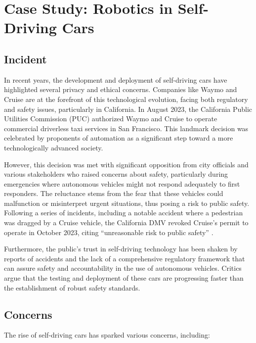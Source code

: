 \section{Case Study: Robotics in Self-Driving Cars}

\subsection{Incident}
In recent years, the development and deployment of self-driving cars have highlighted several privacy and ethical concerns. Companies like Waymo and Cruise are at the forefront of this technological evolution, facing both regulatory and safety issues, particularly in California. In August 2023, the California Public Utilities Commission (PUC) authorized Waymo and Cruise to operate commercial driverless taxi services in San Francisco. This landmark decision was celebrated by proponents of automation as a significant step toward a more technologically advanced society.

However, this decision was met with significant opposition from city officials and various stakeholders who raised concerns about safety, particularly during emergencies where autonomous vehicles might not respond adequately to first responders. The reluctance stems from the fear that these vehicles could malfunction or misinterpret urgent situations, thus posing a risk to public safety. Following a series of incidents, including a notable accident where a pedestrian was dragged by a Cruise vehicle, the California DMV revoked Cruise’s permit to operate in October 2023, citing “unreasonable risk to public safety” \cite{usc_viterbi} \cite{brookings}.

Furthermore, the public's trust in self-driving technology has been shaken by reports of accidents and the lack of a comprehensive regulatory framework that can assure safety and accountability in the use of autonomous vehicles. Critics argue that the testing and deployment of these cars are progressing faster than the establishment of robust safety standards.

\subsection{Concerns}
The rise of self-driving cars has sparked various concerns, including:

